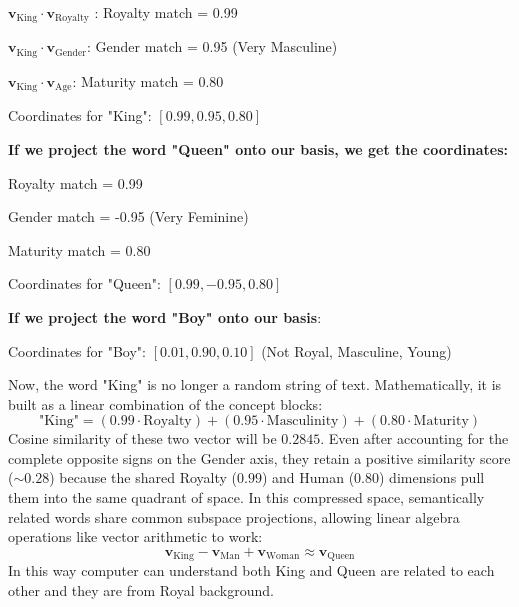 \documentclass[DIV=20,oneside]{scrartcl}
\begin{document}
$\mathbf{v}_{\text{King}} \cdot \mathbf{v}_{\text{Royalty}}$ : Royalty match = 0.99

$\mathbf{v}_{\text{King}} \cdot \mathbf{v}_{\text{Gender}}$: Gender match = 0.95 (Very Masculine)

$\mathbf{v}_{\text{King}} \cdot \mathbf{v}_{\text{Age}}$: Maturity match = 0.80

Coordinates for "King": $[0.99, 0.95, 0.80]$

\textbf{If we project the word "Queen" onto our basis, we get the coordinates:}

Royalty match = 0.99

Gender match = -0.95 (Very Feminine)

Maturity match = 0.80

Coordinates for "Queen": $[0.99, -0.95, 0.80] $

\textbf{If we project the word "Boy" onto our basis}:

Coordinates for "Boy": $[0.01, 0.90, 0.10]$ (Not Royal, Masculine, Young)

Now, the word "King" is no longer a random string of text. Mathematically, it is built as a linear combination of the concept blocks:$$\text{"King"} = (0.99 \cdot \text{Royalty}) + (0.95 \cdot \text{Masculinity}) + (0.80 \cdot \text{Maturity})$$
Cosine similarity of these two vector will be $0.2845$. Even after accounting for the complete opposite signs on the Gender axis, they retain a positive similarity score ($\sim 0.28$) because the shared Royalty ($0.99$) and Human ($0.80$) dimensions pull them into the same quadrant of space. In this compressed space, semantically related words share common subspace projections, allowing linear algebra operations like vector arithmetic to work:$$\mathbf{v}_{\text{King}} - \mathbf{v}_{\text{Man}} + \mathbf{v}_{\text{Woman}} \approx \mathbf{v}_{\text{Queen}}$$
In this way computer can understand both King and Queen are related to each other and they are from Royal background.
\end{document}
